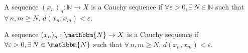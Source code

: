 \documentclass[11pt]{article}
\begin{document}
\begin{definition}
    A sequence $(x_n)_n : \mathbb{N} \to X$ is a Cauchy sequence if 
    ${\forall \varepsilon > 0, \exists \, N \in \mathbb{N}}$ such that 
    ${\forall \, n, m \geq N, \, d \left( x_n, x_m \right) < \varepsilon}$.
\end{definition}

\begin{definition}
    A sequence $(x_n)_n : \mathbbm{N} \to X$ is a Cauchy sequence if 
    ${\forall \varepsilon > 0, \exists \, N \in \mathbbm{N}}$ such that 
    ${\forall \, n, m \geq N, \, d \left( x_n, x_m \right) < \varepsilon}$.
\end{definition}
\end{document}
